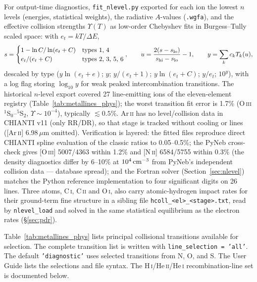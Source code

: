 \documentclass[english,a4paper]{my_memo}
\newcommand{\code}[1]{\texttt{#1}}
\begin{document}
For output-time diagnostics, \code{fit\_nlevel.py} exported for
each ion the lowest $n$ levels (energies, statistical weights),
the radiative $A$-values (\code{.wgfa}), and the effective collision
strengths $\Upsilon(T)$ as low-order Chebyshev fits in Burgess--Tully
scaled space: with $e_t = kT/\Delta E$,
\begin{equation}
  s = \begin{cases} 1 - \ln C/\ln(e_t + C) & \text{types 1, 4}\\
  e_t/(e_t + C) & \text{types 2, 3, 5, 6}\end{cases},
  \qquad
  u = \frac{2(s - s_{\rm lo})}{s_{\rm hi} - s_{\rm lo}} - 1,
  \qquad y = \sum_k c_k T_k(u),
\end{equation}
descaled by type ($y\ln(e_t{+}e)$; $y$; $y/(e_t{+}1)$; $y\ln(e_t{+}C)$;
$y/e_t$; $10^y$), with a log flag storing $\log_{10} y$ for weak peaked
intercombination transitions.  The historical $n$-level export covered 27
line-emitting ions of the eleven-element registry
(Table~\ref{tab:metallines_phys}); the worst transition fit error is
1.7\% (O\,\textsc{iii} $^1$S$_0$--$^5$S$_2$, $\Upsilon\sim10^{-4}$),
typically $\lesssim 0.5\%$.  Ar\,\textsc{ii} has no level/collision data in
CHIANTI v11 (only RR/DR), so that stage is tracked without cooling or
lines ([Ar\,\textsc{ii}] 6.98\,$\mu$m omitted).  Verification is layered: the fitted files
reproduce direct CHIANTI spline evaluation of the classic ratios to
0.05--0.5\%; the PyNeb cross-check gives [O\,\textsc{iii}] 5007/4363
within 1.2\% and [N\,\textsc{ii}] 6584/5755 within 0.3\% (the density
diagnostics differ by 6--10\% at $10^4\,{\rm cm^{-3}}$ from PyNeb's
independent collision data --- database spread); and the Fortran solver
(Section~\ref{sec:nlevel}) matches the Python reference implementation
to four significant digits on 26 lines.  Three atoms, C\,\textsc{i},
C\,\textsc{ii} and O\,\textsc{i}, also carry atomic-hydrogen impact rates
for their ground-term fine structure in a sibling file
\code{hcoll\_<el>\_<stage>.txt}, read by \code{nlevel\_load} and solved in
the same statistical equilibrium as the electron rates (\S\ref{sec:pdr}).

Table~\ref{tab:metallines_phys} lists principal collisional transitions
available for selection. The complete transition list is written with
\code{line\_selection = 'all'}. The default \code{'diagnostic'} uses
selected transitions from N, O, and S. The User Guide lists the selections
and file syntax. The H\,\textsc{i}/He\,\textsc{ii}/He\,\textsc{i}
recombination-line set is documented below.
\end{document}
